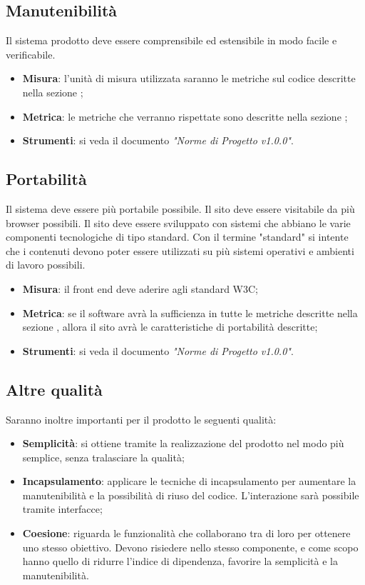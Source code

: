 \documentclass[12pt,a4paper,titlepage]{article}
\begin{document}
		\subsection{Manutenibilità}
		Il sistema prodotto deve essere comprensibile ed estensibile in modo facile e verificabile.
		\begin{itemize}
			\item \textbf{Misura}: l'unità di misura utilizzata saranno le metriche sul codice descritte nella sezione ;
			\item \textbf{Metrica}: le metriche che verranno rispettate sono descritte nella sezione ;
			\item \textbf{Strumenti}: si veda il documento \textit{"Norme di Progetto v1.0.0"}.
		\end{itemize}
	
		\subsection{Portabilità}
		Il sistema deve essere più portabile possibile. Il sito deve essere visitabile da più browser possibili. Il sito deve essere sviluppato con sistemi che abbiano le varie componenti tecnologiche di tipo standard. Con il termine "standard" si intente che i contenuti devono poter essere utilizzati su più sistemi operativi e ambienti di lavoro possibili.
			\begin{itemize}
				\item \textbf{Misura}: il front end deve aderire agli standard W3C;
				\item \textbf{Metrica}: se il software avrà la sufficienza in tutte le metriche descritte nella sezione , allora il sito avrà le caratteristiche di portabilità descritte;
				\item \textbf{Strumenti}: si veda il documento \textit{"Norme di Progetto v1.0.0"}.
			\end{itemize}
		
		\subsection{Altre qualità}
		Saranno inoltre importanti per il prodotto le seguenti qualità:
		\begin{itemize}
			\item \textbf{Semplicità}: si ottiene tramite la realizzazione del prodotto nel modo più semplice, senza tralasciare la qualità;
			\item \textbf{Incapsulamento}: applicare le tecniche di incapsulamento per aumentare la manutenibilità e la possibilità di riuso del codice. L'interazione sarà possibile tramite interfacce;
			\item \textbf{Coesione}: riguarda le funzionalità che collaborano tra di loro per ottenere uno stesso obiettivo. Devono risiedere nello stesso componente, e come scopo hanno quello di ridurre l'indice di dipendenza, favorire la semplicità e la manutenibilità.
		\end{itemize}
	
\end{document}
